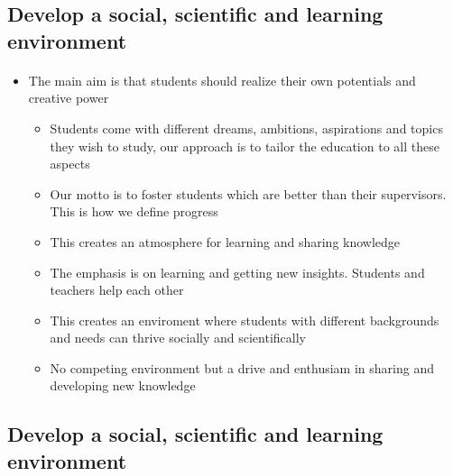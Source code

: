 \documentclass[%
oneside,                 %
final,                   %
10pt]{article}
\begin{document}
\subsection*{Develop a social, scientific and learning environment}

\paragraph{}
\begin{itemize}
\item The main aim is that students should realize their own potentials and creative power
\begin{itemize}

 \item Students come with different dreams, ambitions, aspirations and topics they wish to study, our approach is to tailor the education to all these aspects

 \item Our motto is to foster students which are better than their supervisors. This is how we define progress

 \item This creates an atmosphere for learning and sharing knowledge

 \item The emphasis is on learning and getting new insights. Students and teachers help each other

 \item This creates an enviroment where students with different backgrounds and needs can thrive socially and scientifically

 \item No competing environment but a drive and enthusiam in sharing and developing new knowledge
\end{itemize}

\noindent
\end{itemize}

\noindent





\subsection*{Develop a social, scientific and learning environment}

\end{document}
